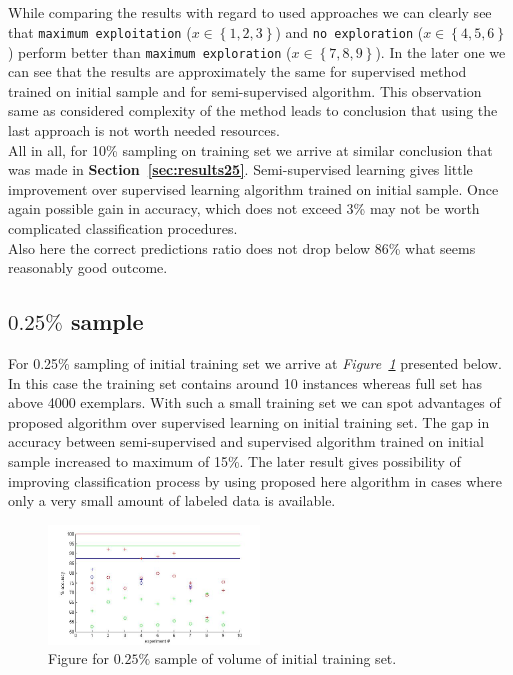 \documentclass[12pt, a4paper, pdflatex]{report}
\begin{document}
\subsection*{}
While comparing the results with regard to used approaches we can clearly see that \texttt{maximum exploitation} ($x \in \left \{ 1, 2, 3 \right \}$) and \texttt{no exploration} ($x \in \left \{ 4, 5, 6 \right \}$) perform better than \texttt{maximum exploration} ($x \in \left \{ 7, 8, 9 \right \}$). In the later one we can see that the results are approximately the same for supervised method trained on initial sample and for semi-supervised algorithm. This observation same as considered complexity of the method leads to conclusion that using the last approach is not worth needed resources.\\

All in all, for 10\% sampling on training set we arrive at similar conclusion that was made in \textbf{Section~\ref{sec:results25}}. Semi-supervised learning gives little improvement over supervised learning algorithm trained on initial sample. Once again possible gain in accuracy, which does not exceed 3\% may not be worth complicated classification procedures.\\
Also here the correct predictions ratio does not drop below 86\% what seems reasonably good outcome.


\subsection{$\mathbf{0.25\%}$ sample~\cite{results025}\label{sec:results025}}
For 0.25\% sampling of initial training set we arrive at \emph{Figure~\ref{img:025pc}} presented below. In this case the training set contains around 10 instances whereas full set has above 4000 exemplars. With such a small training set we can spot advantages of proposed algorithm over supervised learning on initial training set. The gap in accuracy between semi-supervised and supervised algorithm trained on initial sample increased to maximum of 15\%. The later result gives possibility of improving classification process by using proposed here algorithm in cases where only a very small amount of labeled data is available.

\begin{figure}[htbp]
\centering
  \includegraphics[width=0.5\textwidth]{graphics/figures/Pfig3.jpg}
\begin{tiny}
\caption{\small Figure for $0.25\%$ sample of volume of initial training set.\label{img:025pc}}
\end{tiny}
\end{figure}
\end{document}
